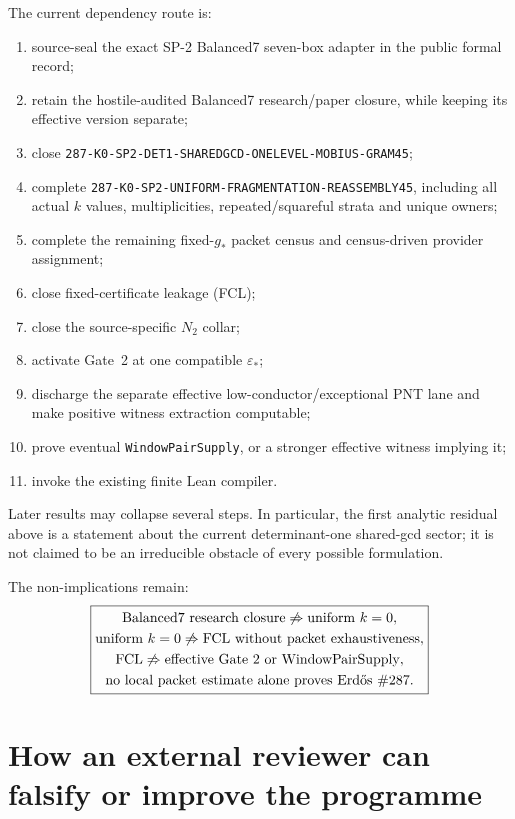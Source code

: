 \documentclass[11pt]{article}
\theoremstyle{definition}
\newcommand{\1}{\mathbf 1}
\begin{document}
The current dependency route is:
\begin{enumerate}[leftmargin=2em]
\item source-seal the exact SP-2 Balanced7 seven-box adapter in the public formal record;
\item retain the hostile-audited Balanced7 research/paper closure, while keeping its
  effective version separate;
\item close
  \texttt{287-K0-SP2-DET1-SHAREDGCD-ONELEVEL-MOBIUS-GRAM45};
\item complete
  \texttt{287-K0-SP2-UNIFORM-FRAGMENTATION-REASSEMBLY45}, including all actual $k$ values,
  multiplicities, repeated/squareful strata and unique owners;
\item complete the remaining fixed-$g_*$ packet census and census-driven provider assignment;
\item close fixed-certificate leakage (FCL);
\item close the source-specific $N_2$ collar;
\item activate Gate~2 at one compatible $\varepsilon_*$;
\item discharge the separate effective low-conductor/exceptional PNT lane and make positive
  witness extraction computable;
\item prove eventual \texttt{WindowPairSupply}, or a stronger effective witness implying it;
\item invoke the existing finite Lean compiler.
\end{enumerate}

Later results may collapse several steps.  In particular, the first analytic residual
above is a statement about the current determinant-one shared-gcd sector; it is not claimed
to be an irreducible obstacle of every possible formulation.

The non-implications remain:
\[
\boxed{
\begin{gathered}
\text{Balanced7 research closure}\not\Rightarrow\text{uniform }k=0,\\
\text{uniform }k=0\not\Rightarrow\text{FCL without packet exhaustiveness},\\
\text{FCL}\not\Rightarrow\text{effective Gate 2 or WindowPairSupply},\\
\text{no local packet estimate alone proves Erd\H{o}s \#287}.
\end{gathered}}
\]


\section{How an external reviewer can falsify or improve the programme}
\label{sec:review-invitation}
\end{document}
